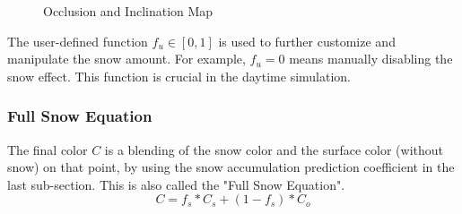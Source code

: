 \documentclass{article}
\begin{document}
\begin{figure}[h]
  \centering
  \caption{Occlusion and Inclination Map}
  \label{fig:Maps}
\end{figure}

The user-defined function \( f_{u} \in [0, 1]\) is used to further customize and manipulate the snow amount. For example, 
\( f_{u}=0 \) means manually disabling the snow effect. This function is crucial in the daytime simulation.

\subsubsection {Full Snow Equation}
The final color \( C \) is a blending of the snow color and the surface color (without snow) on that point, by using the snow accumulation 
prediction coefficient in the last sub-section. This is also called the "Full Snow Equation".
\[
  C = f_{s} * C_{s} + (1-f_{s}) * C_{o}
\]
\end{document}
